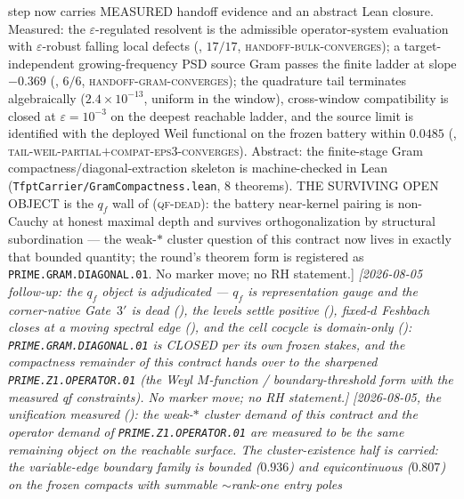 {{step now carries MEASURED handoff evidence and an abstract Lean
closure.  Measured: the $\varepsilon$-regulated resolvent is the
admissible operator-system evaluation with $\varepsilon$-robust
falling local defects (, $17/17$,
\textsc{handoff-bulk-converges}); a target-independent
growing-frequency PSD source Gram passes the finite ladder at slope
$-0.369$ (, $6/6$,
\textsc{handoff-gram-converges}); the quadrature tail terminates
algebraically ($2.4\times10^{-13}$, uniform in the window),
cross-window compatibility is closed at $\varepsilon=10^{-3}$ on the
deepest reachable ladder, and the source limit is identified with
the deployed Weil functional on the frozen battery within $0.0485$
(,
\textsc{tail-weil-partial}$+$\textsc{compat-eps3-converges}).
Abstract: the finite-stage Gram compactness/diagonal-extraction
skeleton is machine-checked in Lean
(\texttt{TfptCarrier/GramCompactness.lean}, $8$ theorems).  THE
SURVIVING OPEN OBJECT is the $q_f$ wall of
 (\textsc{qf-dead}): the battery
near-kernel pairing is non-Cauchy at honest maximal depth and
survives orthogonalization by structural subordination --- the
weak-$*$ cluster question of this contract now lives in exactly that
bounded quantity; the round's theorem form is registered as
\texttt{PRIME.GRAM.DIAGONAL.01}.  No marker move; no RH
statement.]}
\emph{[2026-08-05 follow-up: the $q_f$ object is adjudicated ---
$q_f$ is representation gauge and the corner-native Gate~$3'$ is
dead (), the levels settle
positive (), fixed-$d$
Feshbach closes at a moving spectral edge
(), and the cell cocycle is
domain-only ():
\texttt{PRIME.GRAM.DIAGONAL.01} is CLOSED per its own frozen
stakes, and the compactness remainder of this contract hands over
to the \emph{sharpened} \texttt{PRIME.Z1.OPERATOR.01} (the Weyl
$M$-function / boundary-threshold form with the measured qf
constraints).  No marker move; no RH statement.]}
\emph{[2026-08-05, the unification measured
(): the weak-$*$ cluster
demand of this contract and the operator demand of
\texttt{PRIME.Z1.OPERATOR.01} are measured to be the \emph{same}
remaining object on the reachable surface.  The cluster-existence
half is \emph{carried}: the variable-edge boundary family is
bounded ($0.936$) and equicontinuous ($0.807$) on the frozen
compacts with summable ${\sim}$rank-one entry poles
}}
